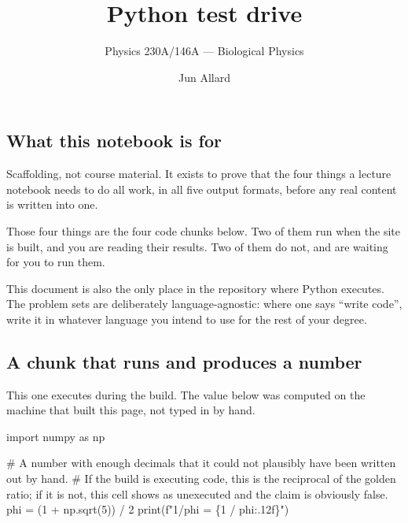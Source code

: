 \documentclass[
  letterpaper,
  DIV=11,
  numbers=noendperiod]{scrartcl}
\title{Python test drive}
\subtitle{Physics 230A/146A --- Biological Physics}
\author{Jun Allard}
\date{}
\newenvironment{Shaded}{\begin{snugshade}}{\end{snugshade}}
\newcommand{\BuiltInTok}[1]{\textcolor[rgb]{0.00,0.23,0.31}{#1}}
\newcommand{\CommentTok}[1]{\textcolor[rgb]{0.37,0.37,0.37}{#1}}
\newcommand{\DecValTok}[1]{\textcolor[rgb]{0.68,0.00,0.00}{#1}}
\newcommand{\ImportTok}[1]{\textcolor[rgb]{0.00,0.46,0.62}{#1}}
\newcommand{\NormalTok}[1]{\textcolor[rgb]{0.00,0.23,0.31}{#1}}
\newcommand{\OperatorTok}[1]{\textcolor[rgb]{0.37,0.37,0.37}{#1}}
\newcommand{\SpecialCharTok}[1]{\textcolor[rgb]{0.37,0.37,0.37}{#1}}
\newcommand{\SpecialStringTok}[1]{\textcolor[rgb]{0.13,0.47,0.30}{#1}}
\begin{document}
\maketitle


\subsection{What this notebook is for}\label{what-this-notebook-is-for}

Scaffolding, not course material.
It exists to prove that the four things a lecture notebook needs to do all work, in all five output formats, before any real content is written into one.

Those four things are the four code chunks below.
Two of them run when the site is built, and you are reading their results.
Two of them do not, and are waiting for you to run them.

This document is also the only place in the repository where Python executes.
The problem sets are deliberately language-agnostic: where one says ``write code'', write it in whatever language you intend to use for the rest of your degree.

\subsection{A chunk that runs and produces a number}\label{a-chunk-that-runs-and-produces-a-number}

This one executes during the build.
The value below was computed on the machine that built this page, not typed in by hand.

\begin{Shaded}
\begin{Highlighting}[]
\ImportTok{import}\NormalTok{ numpy }\ImportTok{as}\NormalTok{ np}

\CommentTok{\# A number with enough decimals that it could not plausibly have been written out by hand.}
\CommentTok{\# If the build is executing code, this is the reciprocal of the golden ratio; if it is not, this cell shows as unexecuted and the claim is obviously false.}
\NormalTok{phi }\OperatorTok{=}\NormalTok{ (}\DecValTok{1} \OperatorTok{+}\NormalTok{ np.sqrt(}\DecValTok{5}\NormalTok{)) }\OperatorTok{/} \DecValTok{2}
\BuiltInTok{print}\NormalTok{(}\SpecialStringTok{f"1/phi = }\SpecialCharTok{\{}\DecValTok{1} \OperatorTok{/}\NormalTok{ phi}\SpecialCharTok{:.12f\}}\SpecialStringTok{"}\NormalTok{)}
\end{Highlighting}
\end{Shaded}
\end{document}
